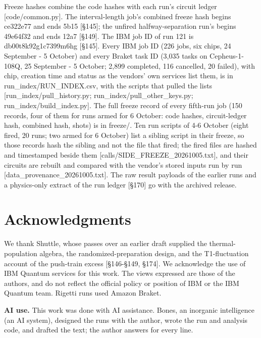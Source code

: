\documentclass[11pt]{article}
\begin{document}
Freeze hashes combine the code hashes with each run's circuit ledger {[}code/common.py{]}. The interval-length job's combined freeze hash begins ce322e77 and ends 5b15 {[}\S{}145{]}; the unfired halfway-separation run's begins 49e64f32 and ends 12a7 {[}\S{}149{]}. The IBM job ID of run 121 is db00t8k92g1c7399m6hg {[}\S{}145{]}. Every IBM job ID (226 jobs, six chips, 24 September - 5 October) and every Braket task ID (3,035 tasks on Cepheus-1-108Q, 25 September - 5 October; 2,899 completed, 116 cancelled, 20 failed), with chip, creation time and status as the vendors' own services list them, is in run\_index/RUN\_INDEX.csv, with the scripts that pulled the lists {[}run\_index/pull\_history.py; run\_index/pull\_other\_keys.py; run\_index/build\_index.py{]}. The full freeze record of every fifth-run job (150 records, four of them for runs armed for 6 October: code hashes, circuit-ledger hash, combined hash, shots) is in freeze/. Ten run scripts of 4-6 October (eight fired, 20 runs; two armed for 6 October) list a sibling script in their freeze, so those records hash the sibling and not the file that fired; the fired files are hashed and timestamped beside them {[}calls/SIDE\_FREEZE\_20261005.txt{]}, and their circuits are rebuilt and compared with the vendor's stored inputs run by run {[}data\_provenance\_20261005.txt{]}. The raw result payloads of the earlier runs and a physics-only extract of the run ledger {[}\S{}170{]} go with the archived release.

\section*{Acknowledgments}
We thank Shuttle, whose passes over an earlier draft supplied the thermal-population algebra, the randomized-preparation design, and the T1-fluctuation account of the push-train excess {[}\S{}146-\S{}149, \S{}174{]}. We acknowledge the use of IBM Quantum services for this work. The views expressed are those of the authors, and do not reflect the official policy or position of IBM or the IBM Quantum team. Rigetti runs used Amazon Braket.

\textbf{AI use.} This work was done with AI assistance. Bones, an inorganic intelligence (an AI system), designed the runs with the author, wrote the run and analysis code, and drafted the text; the author answers for every line.
\end{document}
